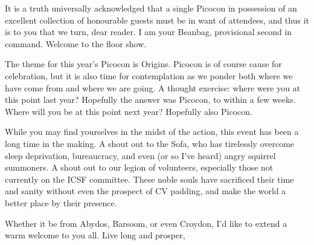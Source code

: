 It is a truth universally acknowledged that a single Picocon in possession of an excellent collection of honourable guests must be in want of attendees, and thus it is to you that we turn, dear reader. I am your Beanbag, provisional second in command. Welcome to the floor show.

The theme for this year’s Picocon is Origins. Picocon is of course cause for celebration, but it is also time for contemplation as we ponder both where we have come from and where we are going. A thought exercise: where were you at this point last year? Hopefully the answer was Picocon, to within a few weeks. Where will you be at this point next year? Hopefully also Picocon.

While you may find yourselves in the midst of the action, this event has been a long time in the making. A shout out to the Sofa, who has tirelessly overcome sleep deprivation, bureaucracy, and even (or so I’ve heard) angry squirrel summoners. A shout out to our legion of volunteers, especially those not currently on the ICSF committee. These noble souls have sacrificed their time and sanity without even the prospect of CV padding, and make the world a better place by their presence.

Whether it be from Abydos, Barsoom, or even Croydon, I’d like to extend a warm welcome to you all. Live long and prosper,
